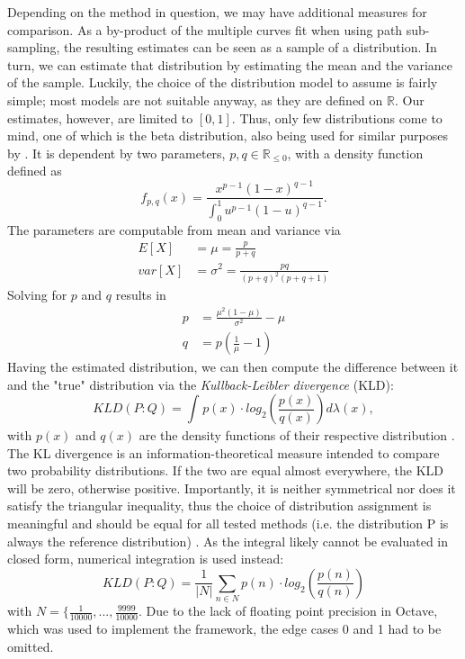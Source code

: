 Depending on the method in question, we may have additional measures for comparison. As a by-product of the multiple curves fit when using path sub-sampling, the resulting estimates can be seen as a sample of a distribution. In turn, we can estimate that distribution by estimating the mean and the variance of the sample. Luckily, the choice of the distribution model to assume is fairly simple; most models are not suitable anyway, as they are defined on $\mathbb{R}$. Our estimates, however, are limited to $[0,1]$. Thus, only few distributions come to mind, one of which is the beta distribution, also being used for similar purposes by \cite{KremplEtAl2014}. It is dependent by two parameters, $p, q \in \mathbb{R}_{\le 0}$, with a density function defined as \cite{GuptaEtAl2004}
\begin{equation}
f_{p, q}(x) = \frac{x^{p-1}(1-x)^{q-1}}{\int_{0}^{1} u^{p-1}(1-u)^{q-1}}.
\end{equation}
The parameters are computable from mean and variance via
\begin{equation}
\begin{split}
E[X] &= \mu = \frac{p}{p+q} \\
var[X] &= \sigma^2 = \frac{pq}{(p+q)^2(p+q+1)}
\end{split}
\end{equation}
Solving for $p$ and $q$ results in
\begin{equation}
\begin{split}
p &= \frac{\mu^2(1-\mu)}{\sigma^2} - \mu \\
q &= p\left(\frac{1}{\mu}-1\right)
\end{split}
\end{equation}
Having the estimated distribution, we can then compute the difference between it and the "true" distribution via the \textit{Kullback-Leibler divergence} (KLD):
\begin{equation}
KLD(P:Q) = \int_{}^{} p(x) \cdot log_2\left(\frac{p(x)}{q(x)}\right) d\lambda (x),
\end{equation}
with $p(x)$ and $q(x)$ are the density functions of their respective distribution \cite{KullbackEtAl1951}. The KL divergence is an information-theoretical measure intended to compare two probability distributions. If the two are equal almost everywhere, the KLD will be zero, otherwise positive. Importantly, it is neither symmetrical nor does it satisfy the triangular inequality, thus the choice of distribution assignment is meaningful and should be equal for all tested methods (i.e. the distribution P is always the reference distribution) \cite{Joyce2011}. As the integral likely cannot be evaluated in closed form, numerical integration is used instead:
\begin{equation}
KLD(P:Q) = \frac{1}{|N|} \sum_{n \in N}^{} p(n) \cdot log_2\left(\frac{p(n)}{q(n)}\right)
\end{equation}
with $N = \{\frac{1}{10000},...,\frac{9999}{10000}$. Due to the lack of floating point precision in Octave, which was used to implement the framework, the edge cases 0 and 1 had to be omitted.


